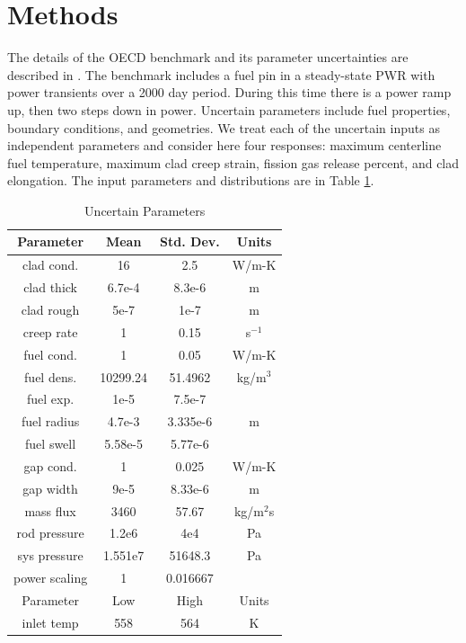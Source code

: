 \documentclass{anstrans} \usepackage{amsmath} \usepackage{amssymb}
\begin{document}
\section{Methods}
The details of the OECD benchmark and its parameter uncertainties are described in \cite{OECDbench}.
The benchmark includes a fuel pin in a steady-state PWR with power transients over a 2000 day period. During
this time there is a power ramp up, then two steps down in power.
Uncertain parameters include fuel properties, boundary conditions, and geometries.  We
treat each of the uncertain inputs as independent parameters and consider here four responses: maximum
centerline fuel temperature, maximum clad creep strain, fission gas
release percent, and clad elongation.  The input parameters and distributions are in Table
\ref{tab:unc}.
\begin{table}
  \centering
  \caption{Uncertain Parameters}
  \label{tab:unc}
  \begin{tabular}{c|c c | c}
  Parameter     & Mean     & Std. Dev.& Units   \\ \hline
  clad cond.    & 16       & 2.5      & W/m-K    \\
  clad thick    & 6.7e-4   & 8.3e-6   & m        \\
  clad rough    & 5e-7     & 1e-7     & m        \\
  creep rate    & 1        & 0.15     & s$^{-1}$ \\
  fuel cond.    & 1        & 0.05     & W/m-K    \\
  fuel dens.    & 10299.24 & 51.4962  & kg/m$^3$ \\
  fuel exp.     & 1e-5     & 7.5e-7   &          \\
  fuel radius   & 4.7e-3   & 3.335e-6 & m        \\
  fuel swell    & 5.58e-5  & 5.77e-6  &          \\
  gap cond.     & 1        & 0.025    & W/m-K    \\
  gap width     & 9e-5     & 8.33e-6  & m        \\
  mass flux     & 3460     & 57.67    & kg/m$^2$s\\
  rod pressure  & 1.2e6    & 4e4      & Pa       \\
  sys pressure  & 1.551e7  & 51648.3  & Pa       \\
  power scaling & 1        & 0.016667 &          \\ \hline
  Parameter     & Low      & High     & Units    \\ \hline
  inlet temp    & 558      & 564      & K
  \end{tabular}
\end{table}
\end{document}
